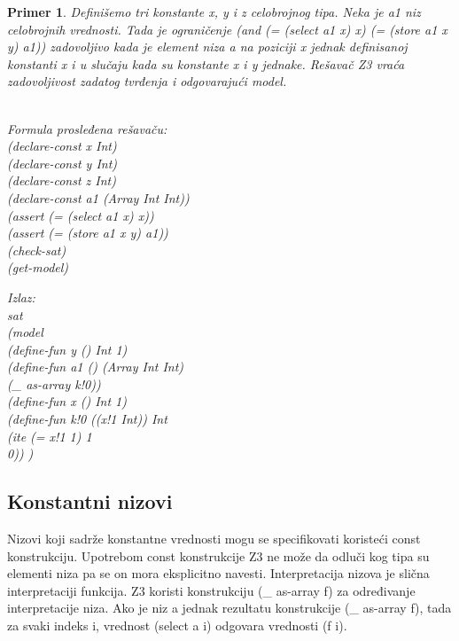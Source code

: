 \documentclass[12pt,oneside]{memoir}
\newtheorem{primer}{Primer}
\begin{document}
\begin{primer} Definišemo tri konstante x, y i z celobrojnog tipa. Neka je a1 niz celobrojnih vrednosti. Tada je ograničenje (and (= (select a1 x) x) (= (store a1 x y) a1)) zadovoljivo kada je element niza a na poziciji x jednak definisanoj konstanti x i u slučaju kada su konstante x i y jednake.
Rešavač Z3 vraća zadovoljivost zadatog tvrđenja i odgovarajući model.
 \\ \\
\begin{minipage}[b]{0.5\textwidth}
Formula prosleđena rešavaču:
\\(declare-const x Int)
\\(declare-const y Int)
\\(declare-const z Int)
\\(declare-const a1 (Array Int Int))
\\(assert (= (select a1 x) x))
\\(assert (= (store a1 x y) a1))
\\(check-sat)
\\(get-model)
\end{minipage}
\hspace{1.3cm} 
\begin{minipage}[t]{0.5\textwidth}
\vspace{-5.4cm}
Izlaz:
\\sat
\\(model 
\\(define-fun y () Int 1)
\\(define-fun a1 () (Array Int Int)
\\(\_ as-array k!0))
\\(define-fun x () Int 1)
\\(define-fun k!0 ((x!1 Int)) Int
\\    (ite (= x!1 1) 1
\\      0))
)

\end{minipage}
\end{primer} 
 

\subsection{Konstantni nizovi}

Nizovi koji sadrže konstantne vrednosti mogu se specifikovati koristeći const konstrukciju. Upotrebom const konstrukcije Z3 ne može da odluči kog tipa su elementi niza pa se on mora eksplicitno navesti. Interpretacija nizova je slična interpretaciji funkcija. Z3 koristi konstrukciju (\_ as-array f) za određivanje interpretacije niza. Ako je niz a jednak rezultatu konstrukcije (\_ as-array f), tada za svaki indeks i, vrednost (select a i) odgovara vrednosti (f i). 
\end{document}
